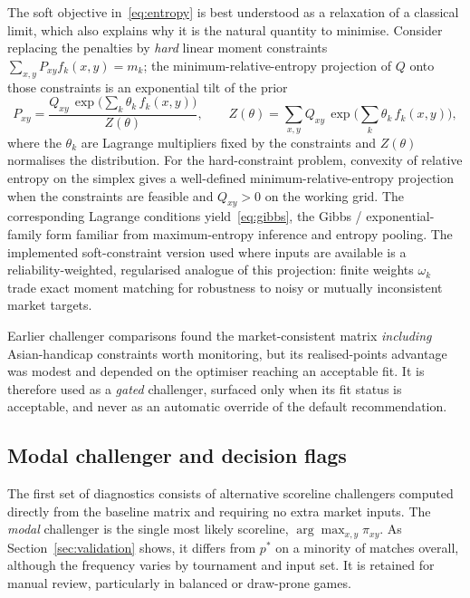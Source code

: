 \documentclass[11pt]{article}
\begin{document}
The soft objective in~\eqref{eq:entropy} is best understood as a relaxation of a classical
limit, which also explains why it is the natural quantity to minimise. Consider replacing the penalties by \textit{hard} linear moment constraints $\sum_{x,y}P_{xy}f_k(x,y)=m_k$; the
minimum-relative-entropy projection of $Q$ onto those constraints is an exponential tilt of
the prior
\begin{equation}
P_{xy}=\frac{Q_{xy}\,\exp\!\big(\sum_k \theta_k\, f_k(x,y)\big)}{Z(\theta)},
\qquad
Z(\theta)=\sum_{x,y}Q_{xy}\,\exp\!\Big(\sum_k \theta_k\, f_k(x,y)\Big),
\label{eq:gibbs}
\end{equation}
where the $\theta_k$ are Lagrange multipliers fixed by the constraints and $Z(\theta)$
normalises the distribution. For the hard-constraint problem, convexity of relative entropy on the simplex gives a well-defined minimum-relative-entropy projection when the constraints are feasible and \(Q_{xy}>0\) on the working grid. The corresponding Lagrange conditions yield~\eqref{eq:gibbs}, the Gibbs / exponential-family form familiar from maximum-entropy inference and entropy pooling. The implemented soft-constraint version used where inputs are available is a reliability-weighted, regularised analogue of this projection: finite weights \(\omega_k\) trade exact moment matching for robustness to noisy or mutually inconsistent market targets.

Earlier challenger comparisons found the market-consistent matrix \emph{including}
Asian-handicap constraints worth monitoring, but its realised-points advantage was modest
and depended on the optimiser reaching an acceptable fit. It is therefore used as a
\emph{gated} challenger, surfaced only when its fit status is acceptable, and never as an automatic override of the default recommendation.

\subsection{Modal challenger and decision flags}

The first set of diagnostics consists of alternative scoreline challengers computed directly
from the baseline matrix and requiring no extra market inputs. The \emph{modal} challenger
is the single most likely scoreline, $\arg\max_{x,y}\pi_{xy}$. As
Section~\ref{sec:validation} shows, it differs from $p^{*}$ on a minority of matches
overall, although the frequency varies by tournament and input set. It is retained for
manual review, particularly in balanced or draw-prone games.
\end{document}
